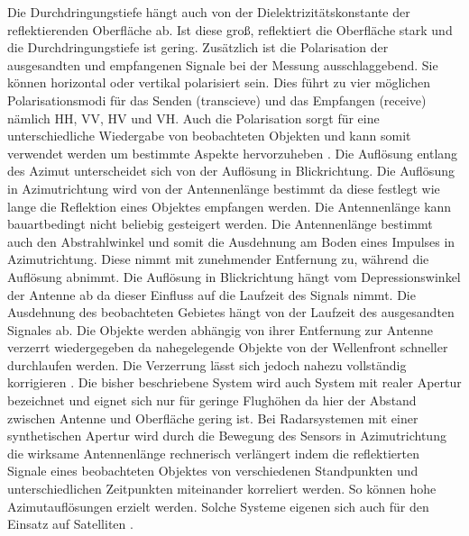 Die Durchdringungstiefe hängt auch von der Dielektrizitätskonstante der reflektierenden Oberfläche ab. Ist diese groß, reflektiert die Oberfläche stark und die 
Durchdringungstiefe ist gering. Zusätzlich ist die Polarisation der ausgesandten und empfangenen Signale bei der Messung ausschlaggebend. Sie können horizontal oder 
vertikal polarisiert sein. Dies führt zu vier möglichen Polarisationsmodi für das Senden (transcieve) und das Empfangen (receive) nämlich HH, VV, HV und VH. Auch die 
Polarisation sorgt für eine unterschiedliche Wiedergabe von beobachteten Objekten und kann somit verwendet werden um bestimmte Aspekte hervorzuheben
 \cite{einfuehrung_in_fernerkundung}. Die Auflösung entlang des Azimut unterscheidet sich von der Auflösung in Blickrichtung. Die Auflösung in Azimutrichtung wird von 
 der Antennenlänge bestimmt da diese festlegt wie lange die Reflektion eines Objektes empfangen werden. Die Antennenlänge kann bauartbedingt nicht beliebig gesteigert werden.
Die Antennenlänge bestimmt auch den Abstrahlwinkel und somit die Ausdehnung am Boden eines Impulses in Azimutrichtung. Diese nimmt mit zunehmender Entfernung
zu, während die Auflösung abnimmt.
Die Auflösung in Blickrichtung hängt vom Depressionswinkel der Antenne ab da dieser Einfluss auf die Laufzeit des Signals nimmt. Die Ausdehnung des beobachteten Gebietes 
hängt von der Laufzeit des ausgesandten Signales ab. Die Objekte werden abhängig von ihrer Entfernung zur Antenne verzerrt wiedergegeben da nahegelegende Objekte von der
Wellenfront schneller durchlaufen werden. Die Verzerrung lässt sich jedoch nahezu vollständig korrigieren \cite{einfuehrung_in_fernerkundung}. 
Die bisher beschriebene System wird auch System mit realer Apertur bezeichnet und eignet sich nur für geringe Flughöhen da hier der Abstand zwischen Antenne und Oberfläche 
gering ist.  Bei Radarsystemen mit einer synthetischen Apertur wird durch die Bewegung des Sensors in Azimutrichtung die wirksame Antennenlänge rechnerisch verlängert 
indem die reflektierten Signale eines beobachteten Objektes von verschiedenen Standpunkten und unterschiedlichen Zeitpunkten miteinander korreliert werden. So können 
hohe Azimutauflösungen erzielt werden. Solche Systeme eigenen sich auch für den Einsatz auf Satelliten \cite{einfuehrung_in_fernerkundung}. 


